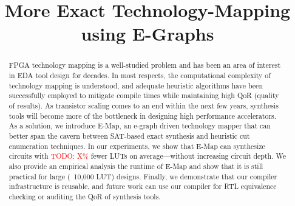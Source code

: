 \documentclass[sigplan,nonacm]{acmart}
\newcommand{\todo}[1]{\textcolor{red}{TODO: #1}}
\newcommand{\fullname}{More Exact Technology-Mapping using E-Graphs}
\newcommand{\shortname}{E-Map}
\begin{document}
\title{\fullname}

\begin{abstract}
    FPGA technology mapping is a well-studied problem and has been an area of interest in EDA tool design for decades.
    In most respects, the computational complexity of technology mapping is understood, and adequate heuristic algorithms have been successfully employed to mitigate compile times while maintaining high QoR (quality of results).
    As transistor scaling comes to an end within the next few years, synthesis tools will become more of the bottleneck in designing high performance accelerators. As a solution, we introduce \shortname{}, an e-graph driven technology mapper that can better span the cavern between SAT-based exact synthesis and heuristic cut enumeration techniques.
    In our experiments, we show that \shortname{} can synthesize circuits with \todo{X\%} fewer LUTs on average---without increasing circuit depth.
    We also provide an empirical analysis the runtime of \shortname{} and show that it is still practical for large (~10,000 LUT) designs.
    Finally, we demonstrate that our compiler infrastructure is reusable, and future work can use our compiler for RTL equivalence checking or auditing the QoR of synthesis tools.
\end{abstract}
\maketitle %








\end{document}
